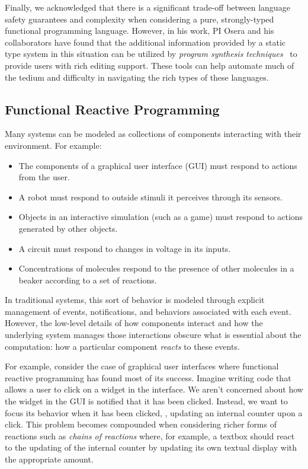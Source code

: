 Finally, we acknowledged that there is a significant trade-off between language safety guarantees and complexity when considering a pure, strongly-typed functional programming language.
However, in his work, PI Osera and his collaborators have found that the additional information provided by a static type system in this situation can be utilized by \emph{program synthesis techniques}~\cite{osera:thesis:2015} to provide users with rich editing support.
These tools can help automate much of the tedium and difficulty in navigating the rich types of these languages.


\subsection{Functional Reactive Programming}
Many systems can be modeled as collections of components interacting with their environment.
For example:
\begin{itemize}[itemsep=0pt]
  \item The components of a graphical user interface (GUI) must respond to actions from the user.
  \item A robot must respond to outside stimuli it perceives through its sensors.
  \item Objects in an interactive simulation (such as a game) must respond to actions generated by other objects.
  \item A circuit must respond to changes in voltage in its inputs.
  \item Concentrations of molecules respond to the presence of other molecules in a beaker according to a set of reactions.
\end{itemize}
In traditional systems, this sort of behavior is modeled through explicit management of events, notifications, and behaviors associated with each event.
However, the low-level details of how components interact and how the underlying system manages those interactions obscure what is essential about the computation: how a particular component \emph{reacts} to these events.

For example, consider the case of graphical user interfaces where functional reactive programming has found most of its success.
Imagine writing code that allows a user to click on a widget in the interface.
We aren't concerned about how the widget in the GUI is notified that it has been clicked.
Instead, we want to focus its behavior when it has been clicked, \eg, updating an internal counter upon a click.
This problem becomes compounded when considering richer forms of reactions such as \emph{chains of reactions} where, for example, a textbox should react to the updating of the internal counter by updating its own textual display with the appropriate amount.

